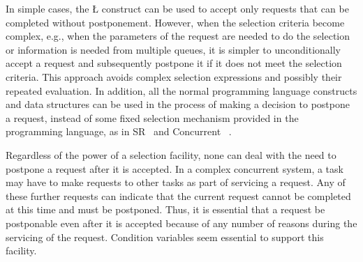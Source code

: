 \documentclass[openright,twoside]{report}
\begin{document}
In simple cases, the \LGinlinetrue\LGbegin\lgrinde\L{}\endlgrinde\LGend{} construct can be used to accept only requests that can be completed without postponement.
However, when the selection criteria become complex, e.g., when the parameters of the request are needed to do the selection or information is needed from multiple queues, it is simpler to unconditionally accept a request and subsequently postpone it if it does not meet the selection criteria.
This approach avoids complex selection expressions and possibly their repeated evaluation.
In addition, all the normal programming language constructs and data structures can be used in the process of making a decision to postpone a request, instead of some fixed selection mechanism provided in the programming language, as in SR~\cite{SR} and Concurrent \CC~\cite{ConcurrentC++}.

Regardless of the power of a selection facility, none can deal with the need to postpone a request after it is accepted.
In a complex concurrent system, a task may have to make requests to other tasks as part of servicing a request.
Any of these further requests can indicate that the current request cannot be completed at this time and must be postponed.
Thus, it is essential that a request be postponable even after it is accepted because of any number of reasons during the servicing of the request.
Condition variables seem essential to support this facility.
\end{document}
